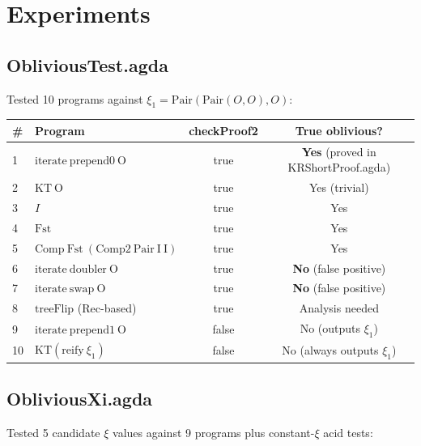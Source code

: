 \documentclass[11pt]{article}
\begin{document}
\section{Experiments}

\subsection{ObliviousTest.agda}

Tested 10 programs against $\xi_1 = \mathrm{Pair}(\mathrm{Pair}(O,O), O)$:

\begin{center}
\begin{tabular}{llcc}
\hline
\# & Program & checkProof2 & True oblivious? \\
\hline
1 & $\mathrm{iterate\ prepend0\ O}$ & true & \textbf{Yes} (proved in KRShortProof.agda) \\
2 & $\mathrm{KT\ O}$ & true & Yes (trivial) \\
3 & $I$ & true & Yes \\
4 & $\mathrm{Fst}$ & true & Yes \\
5 & $\mathrm{Comp\ Fst\ (Comp2\ Pair\ I\ I)}$ & true & Yes \\
6 & $\mathrm{iterate\ doubler\ O}$ & true & \textbf{No} (false positive) \\
7 & $\mathrm{iterate\ swap\ O}$ & true & \textbf{No} (false positive) \\
8 & $\mathrm{treeFlip}$ (Rec-based) & true & Analysis needed \\
9 & $\mathrm{iterate\ prepend1\ O}$ & false & No (outputs $\xi_1$) \\
10 & $\mathrm{KT}(\mathrm{reify}\ \xi_1)$ & false & No (always outputs $\xi_1$) \\
\hline
\end{tabular}
\end{center}

\subsection{ObliviousXi.agda}

Tested 5 candidate $\xi$ values against 9 programs plus constant-$\xi$ acid tests:
\end{document}
